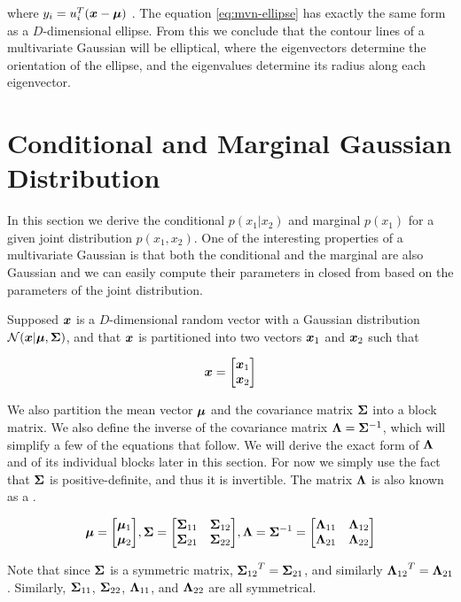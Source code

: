 where $y_i = u_{i}^{T} ({\bm{x}} - {\bm{\mu}})$ . The equation \eqref{eq:mvn-ellipse} has exactly the same form as a $D$-dimensional ellipse. From this we conclude that the contour lines of a multivariate Gaussian will be elliptical, where the eigenvectors determine the orientation of the ellipse, and the eigenvalues determine its radius  along each eigenvector.


\section{Conditional and Marginal Gaussian Distribution}

In this section we derive the conditional $p(x_1 | x_2)$ and marginal $p(x_1)$ for a given joint distribution $p(x_1, x_2)$. One of the interesting properties of a multivariate Gaussian is that both the conditional and the marginal are also Gaussian and we can easily compute their parameters in closed from based on the parameters of the joint distribution.

Supposed ${\bm{x}}$ is a $D$-dimensional random vector with a Gaussian distribution ${\mathcal{N}}({\bm{x}} | {\bm{\mu}}, {\bm{\Sigma}})$, and that ${\bm{x}}$ is partitioned into two vectors ${\bm{x}}_1$ and ${\bm{x}}_2$ such that

\begin{equation}
{\bm{x}} = {\begin{bmatrix} {\bm{x}}_1 \\ {\bm{x}}_2 \end{bmatrix}}
\end{equation}

We also partition the mean vector ${\bm{\mu}}$ and the covariance matrix ${\bm{\Sigma}}$ into a block matrix. We also define the inverse of the covariance matrix ${\bm{\Lambda}} = {\bm{\Sigma}}^{-1}$, which will simplify a few of the equations that follow. We will derive the exact form of ${\bm{\Lambda}}$ and of its individual blocks later in this section. For now we simply use the fact that ${\bm{\Sigma}}$ is positive-definite, and thus it is invertible. The matrix ${\bm{\Lambda}}$ is also known as a .

\begin{equation}
{\bm{\mu}} = {\begin{bmatrix} {\bm{\mu}}_1 \\ {\bm{\mu}}_2 \end{bmatrix}},
{\bm{\Sigma}} = {\begin{bmatrix} {{\bm{\Sigma}}_{11}} & {{\bm{\Sigma}}_{12}} \\ {{\bm{\Sigma}}_{21}} & {{\bm{\Sigma}}_{22}} \end{bmatrix}}, {\bm{\Lambda}} = {\bm{\Sigma}}^{-1} = {\begin{bmatrix} {{\bm{\Lambda}}_{11}} & {{\bm{\Lambda}}_{12}} \\ {{\bm{\Lambda}}_{21}} & {{\bm{\Lambda}}_{22}} \end{bmatrix}} \label{eq:mvn-partition}
\end{equation}

Note that since ${\bm{\Sigma}}$ is a symmetric matrix, ${{\bm{\Sigma}}_{12}}^T = {{\bm{\Sigma}}_{21}}$, and similarly ${{\bm{\Lambda}}_{12}}^T = {{\bm{\Lambda}}_{21}}$. Similarly, ${{\bm{\Sigma}}_{11}}$, ${{\bm{\Sigma}}_{22}}$, ${{\bm{\Lambda}}_{11}}$, and ${{\bm{\Lambda}}_{22}}$ are all symmetrical.

